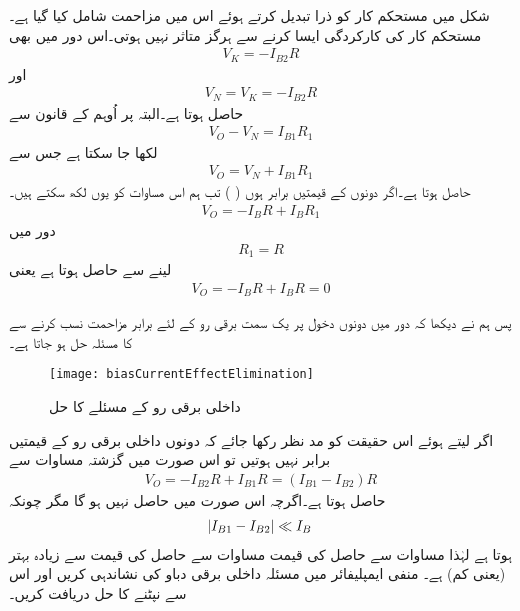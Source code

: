 	شکل  میں مستحکم کار کو ذرا تبدیل کرتے ہوئے اس میں مزاحمت  شامل کیا گیا ہے۔مستحکم کار کی کارکردگی ایسا کرنے سے ہرگز متاثر نہیں ہوتی۔اس دور میں بھی
\begin{align*}
V_K=-I_{B2}R
\end{align*}
اور
\begin{align*}
V_N=V_K=-I_{B2}R
\end{align*}
حاصل ہوتا ہے۔البتہ  پر اُوہم کے قانون سے
\begin{align*}
V_O-V_N=I_{B1}R_1
\end{align*}
لکھا جا سکتا ہے جس سے
\begin{align*}
V_O=V_N+I_{B1}R_1
\end{align*}
حاصل ہوتا ہے۔اگر دونوں  کے قیمتیں برابر ہوں ( ) تب ہم اس مساوات کو یوں لکھ سکتے ہیں۔
\begin{align*}
V_O=-I_B R +I_B R_1
\end{align*}
دور میں
\begin{align}
R_1=R
\end{align}
لینے سے حاصل ہوتا ہے یعنی
\begin{align*}
V_O=-I_B R +I_B R=0
\end{align*}

پس ہم نے دیکھا کہ دور میں دونوں دخول پر یک سمت برقی رو کے لئے برابر مزاحمت نسب کرنے سے  کا مسئلہ حل ہو جاتا ہے۔
\begin{figure}
\centering
\texttt{[image: biasCurrentEffectElimination]}
\caption{داخلی برقی رو کے مسئلے کا حل}
\label{شکل_داخلی_برقی_رو_کے_مسئلے_کا_حل}
\end{figure}

اگر لیتے ہوئے اس حقیقت کو مد نظر رکھا جائے کہ دونوں داخلی برقی رو کے قیمتیں برابر نہیں ہوتیں تو اس صورت میں گزشتہ مساوات سے
\begin{align} \label{مساوات_انحرافی_رو_سے_پیدا_درست_دباو}
V_O=-I_{B2}R+I_{B1}R=\left (I_{B1}-I_{B2} \right )R
\end{align}
حاصل ہوتا ہے۔اگرچہ اس صورت میں  حاصل نہیں ہو گا مگر چونکہ
\begin{align*}
\abs{I_{B1}-I_{B2}} \ll I_B
\end{align*} 
ہوتا ہے لہٰذا مساوات  سے حاصل  کی قیمت مساوات   سے حاصل  کی قیمت سے زیادہ بہتر (یعنی کم) ہے۔
منفی ایمپلیفائر میں مسئلہ داخلی برقی دباو کی نشاندہی کریں اور اس سے نپٹنے کا حل دریافت کریں۔

